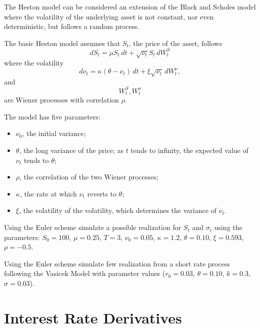 \documentclass[12pt,a4paper]{book}
\begin{document}
\begin{question}[subtitle=Heston Model  (\texttt{python})]
The Heston model can be considered an extension of the Black and Scholes model where the volatility of the underlying asset is not constant, nor even deterministic, but follows a random process.

The basic Heston model assumes that $S_t$, the price of the asset, follows
\begin{equation}
dS_{t}=\mu S_{t}\,dt+{\sqrt {\nu _{t}}}S_{t}\,dW_{t}^{S}
\end{equation}
where the volatility 
\begin{equation}
{\displaystyle d\nu _{t}=\kappa (\theta -\nu _{t})\,dt+\xi {\sqrt {\nu _{t}}}\,dW_{t}^{\nu },}
\end{equation}
and 
\begin{equation}
W_{t}^{S},W_{t}^{\nu }
\end{equation} 
are Wiener processes with correlation $\rho$.

The model has five parameters:
\begin{itemize}
\item $\nu _0$, the initial variance;
\item $\theta$, the long variance of the price; as $t$ tends to infinity, the expected value of $\nu_t$ tends to $\theta$;
\item $\rho$, the correlation of the two Wiener processes;
\item $\kappa$, the rate at which $\nu_t$ reverts to $\theta$;
\item $\xi$, the volatility of the volatility, which determines the variance of $\nu_t$.
\end{itemize}

Using the Euler scheme simulate a possible realization for $S_t$ and $\sigma_t$ using the parameters: $S_0=100$, $\mu=0.25$, $T=3$, $\nu_0=0.05$, $\kappa=1.2$, $\theta=0.10$, $\xi=0.593$, $\rho=-0.5$.
\end{question}

\begin{question}[subtitle=Vasicek Model  (\texttt{python})]
Using the Euler scheme simulate few realization from a short rate process following the Vasicek Model with parameter values ($r_0=0.03$, $\theta=0.10$, $k=0.3$, $\sigma=0.03$).
\end{question}

\chapter{Interest Rate Derivatives}
\end{document}
